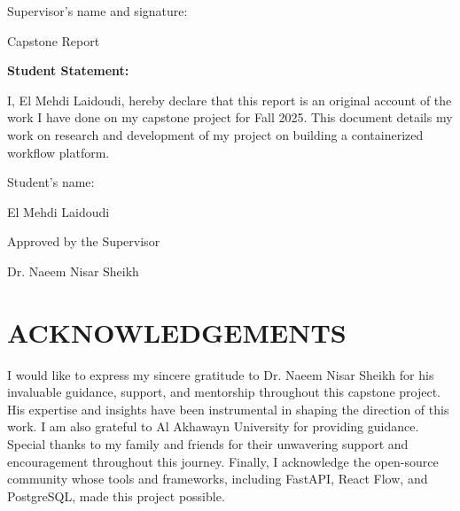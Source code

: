 \documentclass[12pt]{article}
\begin{document}
\vspace{2cm}

Supervisor's name and signature: \hspace{4cm} \underline{\hspace{5cm}}


\vspace{5cm}

\begin{center}
Capstone Report
\end{center}

\vspace{0.5cm}

\noindent
\textbf{Student Statement:}

I, El Mehdi Laidoudi, hereby declare that this report is an original account of the work I have done on my capstone project for Fall 2025. This document details my work on research and development of my project on building a containerized workflow platform.

\vspace{2cm}

\noindent
\makebox[\textwidth]{\hrulefill}

\begin{center}
Student's name:

El Mehdi Laidoudi
\end{center}

\vspace{3cm}

\begin{center}
Approved by the Supervisor
\end{center}

\vspace{2cm}

\noindent
\makebox[\textwidth]{\hrulefill}

\begin{center}
Dr. Naeem Nisar Sheikh
\end{center}

\newpage
\section*{ACKNOWLEDGEMENTS}

\noindent
\parbox{\textwidth}{%
I would like to express my sincere gratitude to Dr. Naeem Nisar Sheikh for his invaluable guidance, support, and mentorship throughout this capstone project. His expertise and insights have been instrumental in shaping the direction of this work. I am also grateful to Al Akhawayn University for providing guidance. Special thanks to my family and friends for their unwavering support and encouragement throughout this journey. Finally, I acknowledge the open-source community whose tools and frameworks, including FastAPI, React Flow, and PostgreSQL, made this project possible.
}
\end{document}
